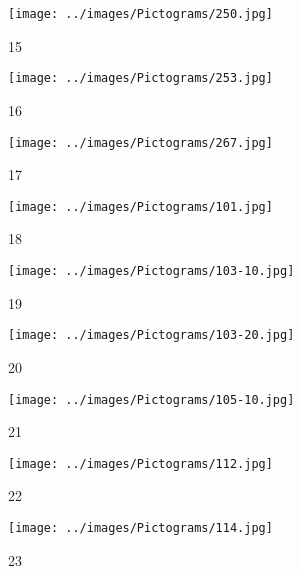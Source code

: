 \begin{figure}[H]
  \begin{subfigure}[b]{0.1\textwidth}
  \centering
  \texttt{[image: ../images/Pictograms/250.jpg]}
  \caption{15}
  \end{subfigure}
  \hspace{3em}%
  \begin{subfigure}[b]{0.1\textwidth}
	\centering
	\texttt{[image: ../images/Pictograms/253.jpg]}
	\caption{16}
\end{subfigure}
\hspace{3em}%
\begin{subfigure}[b]{0.1\textwidth}
	\centering
	\texttt{[image: ../images/Pictograms/267.jpg]}
	\caption{17}
\end{subfigure}
\hspace{3em}%
\begin{subfigure}[b]{0.1\textwidth}
	\centering
	\texttt{[image: ../images/Pictograms/101.jpg]}
	\caption{18}
\end{subfigure}
\hspace{3em}%
\begin{subfigure}[b]{0.1\textwidth}
\centering
\texttt{[image: ../images/Pictograms/103-10.jpg]}
\caption{19}
\end{subfigure}
\hspace{3em}%
\begin{subfigure}[b]{0.1\textwidth}
  \centering
  \texttt{[image: ../images/Pictograms/103-20.jpg]}
  \caption{20}
\end{subfigure}
\hspace{3em}%
\begin{subfigure}[b]{0.1\textwidth}
  \centering
  \texttt{[image: ../images/Pictograms/105-10.jpg]}
  \caption{21}
\end{subfigure}
\hspace{3em}%
\begin{subfigure}[b]{0.1\textwidth}
  \centering
  \texttt{[image: ../images/Pictograms/112.jpg]}
  \caption{22}
\end{subfigure}
\hspace{3em}%
\begin{subfigure}[b]{0.1\textwidth}
\centering
\texttt{[image: ../images/Pictograms/114.jpg]}
\caption{23}
\end{subfigure}
\hspace{3em}%
\begin{subfigure}[b]{0.1\textwidth}

\end{subfigure}
\end{figure}
